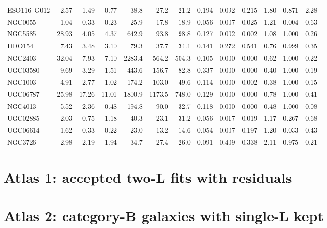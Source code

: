 \documentclass[10pt]{article}
\begin{document}
\begin{landscape}
{\begin{longtable}{lrrrrrrrrrrrr}
ESO116--G012 & 2.57 & 1.49 & 0.77 & 38.8 & 27.2 & 21.2 & 0.194 & 0.092 & 0.215 & 1.80 & 0.871 & 2.28\\
NGC0055 & 1.04 & 0.33 & 0.23 & 25.9 & 17.8 & 18.9 & 0.056 & 0.007 & 0.025 & 1.21 & 0.004 & 0.63\\
\midrule
NGC5585 & 28.93 & 4.05 & 4.37 & 642.9 & 93.8 & 98.8 & 0.127 & 0.002 & 0.002 & 1.08 & 1.000 & 0.26\\
DDO154 & 7.43 & 3.48 & 3.10 & 79.3 & 37.7 & 34.1 & 0.141 & 0.272 & 0.541 & 0.76 & 0.999 & 0.35\\
NGC2403 & 32.04 & 7.93 & 7.10 & 2283.4 & 564.2 & 504.3 & 0.105 & 0.000 & 0.000 & 0.62 & 1.000 & 0.22\\
UGC03580 & 9.69 & 3.29 & 1.51 & 443.6 & 156.7 & 82.8 & 0.337 & 0.000 & 0.000 & 0.40 & 1.000 & 0.19\\
NGC1003 & 4.91 & 2.77 & 1.02 & 174.2 & 103.0 & 49.6 & 0.114 & 0.000 & 0.002 & 0.38 & 1.000 & 0.15\\
\midrule
UGC06787 & 25.98 & 17.26 & 11.01 & 1800.9 & 1173.5 & 748.0 & 0.129 & 0.000 & 0.000 & 0.78 & 1.000 & 0.41\\
NGC4013 & 5.52 & 2.36 & 0.48 & 194.8 & 90.0 & 32.7 & 0.118 & 0.000 & 0.000 & 0.48 & 1.000 & 0.08\\
UGC02885 & 2.03 & 0.75 & 1.18 & 40.3 & 23.1 & 31.2 & 0.056 & 0.017 & 0.019 & 1.17 & 0.267 & 0.68\\
UGC06614 & 1.62 & 0.33 & 0.22 & 23.0 & 13.2 & 14.6 & 0.054 & 0.007 & 0.197 & 1.20 & 0.033 & 0.43\\
NGC3726 & 2.98 & 2.19 & 1.94 & 34.7 & 27.4 & 26.0 & 0.091 & 0.409 & 0.338 & 2.11 & 0.975 & 0.21\\
\end{longtable}}\end{landscape}
\section*{Atlas 1: accepted two-L fits with residuals}
\section*{Atlas 2: category-B galaxies with single-L kept}
\end{document}
